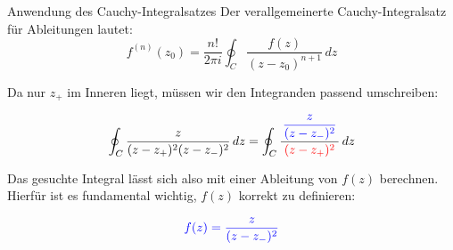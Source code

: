 \documentclass[11pt, aspectratio=169]{beamer}
\begin{document}
\begin{frame}{Anwendung des Cauchy-Integralsatzes}
    Der verallgemeinerte Cauchy-Integralsatz für Ableitungen lautet:
    \[ f^{(n)}(z_0) = \frac{n!}{2\pi i} \oint_C \frac{f(z)}{(z - z_0)^{n+1}} \, dz \]

    Da nur $z_+$ im Inneren liegt, müssen wir den Integranden passend umschreiben:

    \[ \oint_C \frac{z}{(z - z_+)^2 (z - z_-)^2} \, dz = \oint_C \frac{ \color{blue}{ \dfrac{z}{(z - z_-)^2} } }{ \color{red}{\;(z - z_+)^2\;} } \, dz \]

    \vspace{0.3cm}
    Das gesuchte Integral lässt sich also mit einer Ableitung von $f(z)$ berechnen. Hierfür ist es fundamental wichtig, $f(z)$ korrekt zu definieren:
    \begin{block}{}
        \Large
        \[ \color{blue}{f(z) = \frac{z}{(z - z_-)^2}} \]
    \end{block}

\end{frame}
\end{document}
